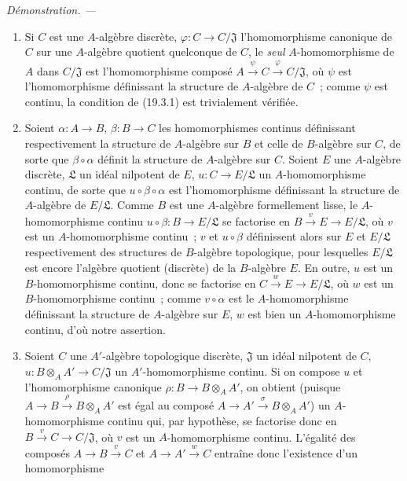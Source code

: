 \documentclass[10pt,oneside]{book}
\newenvironment{proof}{%
  \par\medskip\noindent\textit{Démonstration. ---\ }}{\par}
\begin{document}
\begin{proof}
\begin{enumerate}
  \item[(i)] Si $C$ est une $A$-algèbre discrète,
  $\varphi:C\to C/\mathfrak J$ l'homomorphisme canonique de $C$ sur une
  $A$-algèbre quotient quelconque de $C$, le \emph{seul} $A$-homomorphisme
  de $A$ dans $C/\mathfrak J$ est l'homomorphisme composé
  $A\xrightarrow{\psi}C\xrightarrow{\varphi}C/\mathfrak J$, où
  $\psi$ est l'homomorphisme définissant la structure de $A$-algèbre de
  $C$~; comme $\psi$ est continu, la condition de (19.3.1) est trivialement
  vérifiée.
  \item[(ii)] Soient $\alpha:A\to B$, $\beta:B\to C$ les homomorphismes
  continus définissant respectivement la structure de $A$-algèbre sur $B$ et
  celle de $B$-algèbre sur $C$, de sorte que $\beta\circ\alpha$ définit la
  structure de $A$-algèbre sur $C$. Soient $E$ une $A$-algèbre discrète,
  $\mathfrak L$ un idéal nilpotent de $E$, $u:C\to E/\mathfrak L$ un
  $A$-homomorphisme continu, de sorte que $u\circ\beta\circ\alpha$ est
  l'homomorphisme définissant la structure de $A$-algèbre de
  $E/\mathfrak L$. Comme $B$ est une $A$-algèbre formellement lisse, le
  $A$-homomorphisme continu $u\circ\beta:B\to E/\mathfrak L$ se
  factorise en $B\xrightarrow{v}E\to E/\mathfrak L$, où $v$ est un
  $A$-homomorphisme continu~; $v$ et $u\circ\beta$ définissent alors sur
  $E$ et $E/\mathfrak L$ respectivement des structures de $B$-algèbre
  topologique, pour lesquelles $E/\mathfrak L$ est encore l'algèbre quotient
  (discrète) de la $B$-algèbre $E$. En outre, $u$ est un $B$-homomorphisme
  continu, donc se factorise en $C\xrightarrow{w}E\to E/\mathfrak L$,
  où $w$ est un $B$-homomorphisme continu~; comme
  $v\circ\alpha$ est le $A$-homomorphisme définissant la structure de
  $A$-algèbre sur $E$, $w$ est bien un $A$-homomorphisme continu, d'où notre
  assertion.
  \item[(iii)] Soient $C$ une $A'$-algèbre topologique discrète,
  $\mathfrak J$ un idéal nilpotent de $C$,
  $u:B\otimes_A A'\to C/\mathfrak J$ un $A'$-homomorphisme continu. Si on
  compose $u$ et l'homomorphisme canonique
  $\rho:B\to B\otimes_A A'$, on obtient (puisque
  $A\to B\xrightarrow{\rho}B\otimes_A A'$ est égal au composé
  $A\to A'\xrightarrow{\sigma}B\otimes_A A'$) un $A$-homomorphisme
  continu qui, par hypothèse, se factorise donc en
  $B\xrightarrow{v}C\to C/\mathfrak J$, où $v$ est un $A$-homomorphisme
  continu. L'égalité des composés $A\to B\xrightarrow{v}C$ et
  $A\to A'\xrightarrow{w}C$ entraîne donc l'existence d'un homomorphisme

\end{enumerate}
\end{proof}
\end{document}
